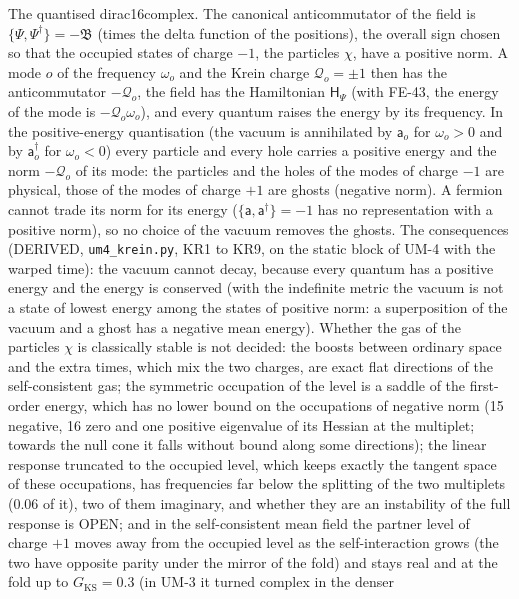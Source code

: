 \documentclass[
  10pt,
]{article}
\begin{document}
The quantised dirac16complex. The canonical anticommutator of the field
is \(\{\Psi, \Psi^\dagger\} = -\mathfrak{B}\) (times the delta function
of the positions), the overall sign chosen so that the occupied states
of charge \(-1\), the particles \(\chi\), have a positive norm. A mode
\(o\) of the frequency \(\omega_o\) and the Krein charge
\(\mathcal{Q}_o = \pm1\) then has the anticommutator \(-\mathcal{Q}_o\),
the field has the Hamiltonian \(\mathsf{H}_\Psi\) (with FE-43, the
energy of the mode is \(-\mathcal{Q}_o\omega_o\)), and every quantum
raises the energy by its frequency. In the positive-energy quantisation
(the vacuum is annihilated by \(\mathsf{a}_o\) for \(\omega_o > 0\) and
by \(\mathsf{a}_o^\dagger\) for \(\omega_o < 0\)) every particle and
every hole carries a positive energy and the norm \(-\mathcal{Q}_o\) of
its mode: the particles and the holes of the modes of charge \(-1\) are
physical, those of the modes of charge \(+1\) are ghosts (negative
norm). A fermion cannot trade its norm for its energy
(\(\{\mathsf{a}, \mathsf{a}^\dagger\} = -1\) has no representation with
a positive norm), so no choice of the vacuum removes the ghosts. The
consequences (DERIVED, \texttt{um4\_krein.py}, KR1 to KR9, on the static
block of UM-4 with the warped time): the vacuum cannot decay, because
every quantum has a positive energy and the energy is conserved (with
the indefinite metric the vacuum is not a state of lowest energy among
the states of positive norm: a superposition of the vacuum and a ghost
has a negative mean energy). Whether the gas of the particles \(\chi\)
is classically stable is not decided: the boosts between ordinary space
and the extra times, which mix the two charges, are exact flat
directions of the self-consistent gas; the symmetric occupation of the
level is a saddle of the first-order energy, which has no lower bound on
the occupations of negative norm (15 negative, 16 zero and one positive
eigenvalue of its Hessian at the multiplet; towards the null cone it
falls without bound along some directions); the linear response
truncated to the occupied level, which keeps exactly the tangent space
of these occupations, has frequencies far below the splitting of the two
multiplets (0.06 of it), two of them imaginary, and whether they are an
instability of the full response is OPEN; and in the self-consistent
mean field the partner level of charge \(+1\) moves away from the
occupied level as the self-interaction grows (the two have opposite
parity under the mirror of the fold) and stays real and at the fold up
to \(G_{\mathrm{KS}} = 0.3\) (in UM-3 it turned complex in the denser
\end{document}
